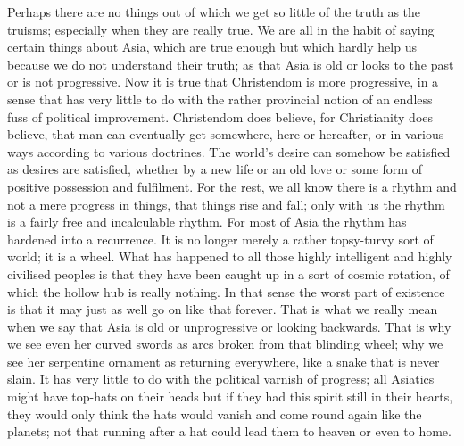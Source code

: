 Perhaps there are no things out of which we get so little of the truth as the truisms; especially when they are really true. We are all in the habit of saying certain things about Asia, which are true enough but which hardly help us because we do not understand their truth; as that Asia is old or looks to the past or is not progressive. Now it is true that Christendom is more progressive, in a sense that has very little to do with the rather provincial notion of an endless fuss of political improvement. Christendom does believe, for Christianity does believe, that man can eventually get somewhere, here or hereafter, or in various ways according to various doctrines. The world's desire can somehow be satisfied as desires are satisfied, whether by a new life or an old love or some form of positive possession and fulfilment. For the rest, we all know there is a rhythm and not a mere progress in things, that things rise and fall; only with us the rhythm is a fairly free and incalculable rhythm. For most of Asia the rhythm has hardened into a recurrence. It is no longer merely a rather topsy-turvy sort of world; it is a wheel. What has happened to all those highly intelligent and highly civilised peoples is that they have been caught up in a sort of cosmic rotation, of which the hollow hub is really nothing. In that sense the worst part of existence is that it may just as well go on like that forever. That is what we really mean when we say that Asia is old or unprogressive or looking backwards. That is why we see even her curved swords as arcs broken from that blinding wheel; why we see her serpentine ornament as returning everywhere, like a snake that is never slain. It has very little to do with the political varnish of progress; all Asiatics might have top-hats on their heads but if they had this spirit still in their hearts, they would only think the hats would vanish and come round again like the planets; not that running after a hat could lead them to heaven or even to home.

